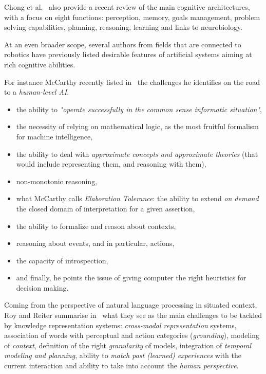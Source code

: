 Chong et al.~\cite{Chong2009} also provide a recent review of the main cognitive
architectures, with a focus on eight functions: perception, memory, goals
management, problem solving capabilities, planning, reasoning, learning and
links to neurobiology.

At an even broader scope, several authors from fields that are connected to
robotics have previously listed desirable features of artificial systems aiming
at rich cognitive abilities.

For instance McCarthy recently listed in~\cite{McCarthy2007} the challenges he
identifies on the road to a \emph{human-level AI}.

\begin{itemize}

	\item the ability to \emph{"operate successfully in the common sense
	informatic situation"},

	\item the necessity of relying on mathematical logic, as the most fruitful
	formalism for machine intelligence,

	\item the ability to deal with \emph{approximate concepts and approximate
	theories} (that would include representing them, and reasoning with them),

	\item non-monotonic reasoning,

	\item what McCarthy calls \emph{Elaboration Tolerance}: the ability to
	extend \emph{on demand} the closed domain of interpretation for a
	given assertion,

	\item the ability to formalize and reason about contexts,

	\item reasoning about events, and in particular, actions,

	\item the capacity of introspection,

	\item and finally, he points the issue of giving computer the right
	heuristics for decision making.

\end{itemize}

Coming from the perspective of natural language processing in situated context,
Roy and Reiter summarise in~\cite{Roy2005} what they see as the main challenges
to be tackled by knowledge representation systems: \emph{cross-modal
representation} systems, association of words with perceptual and action
categories (\emph{grounding}), modeling of \emph{context}, definition of the
right \emph{granularity} of models, integration of \emph{temporal modeling and
planning}, ability to \emph{match past (learned) experiences} with the current
interaction and ability to take into account the \emph{human perspective}.

